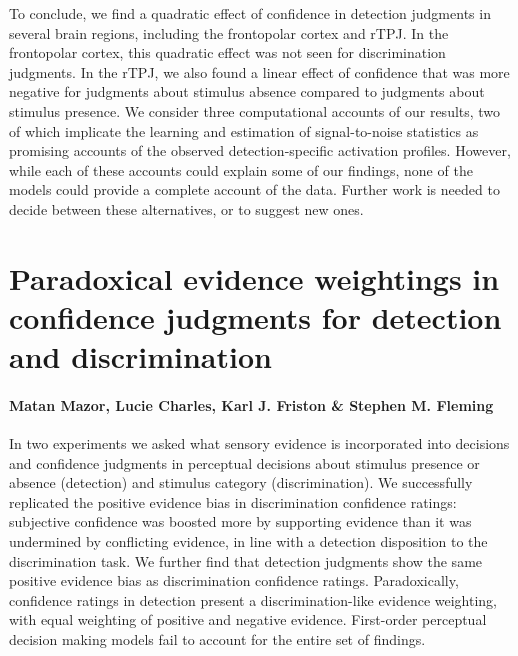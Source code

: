 \documentclass[12pt,twoside]{reedthesis}
\begin{document}
To conclude, we find a quadratic effect of confidence in detection judgments in several brain regions, including the frontopolar cortex and rTPJ. In the frontopolar cortex, this quadratic effect was not seen for discrimination judgments. In the rTPJ, we also found a linear effect of confidence that was more negative for judgments about stimulus absence compared to judgments about stimulus presence. We consider three computational accounts of our results, two of which implicate the learning and estimation of signal-to-noise statistics as promising accounts of the observed detection-specific activation profiles. However, while each of these accounts could explain some of our findings, none of the models could provide a complete account of the data. Further work is needed to decide between these alternatives, or to suggest new ones.

\hypertarget{ch:RC}{%
\chapter{Paradoxical evidence weightings in confidence judgments for detection and discrimination}\label{ch:RC}}

\hypertarget{matan-mazor-lucie-charles-karl-j.-friston-stephen-m.-fleming}{%
\subsubsection*{Matan Mazor, Lucie Charles, Karl J. Friston \& Stephen M. Fleming}\label{matan-mazor-lucie-charles-karl-j.-friston-stephen-m.-fleming}}

In two experiments we asked what sensory evidence is incorporated into decisions and confidence judgments in perceptual decisions about stimulus presence or absence (detection) and stimulus category (discrimination). We successfully replicated the positive evidence bias in discrimination confidence ratings: subjective confidence was boosted more by supporting evidence than it was undermined by conflicting evidence, in line with a detection disposition to the discrimination task. We further find that detection judgments show the same positive evidence bias as discrimination confidence ratings. Paradoxically, confidence ratings in detection present a discrimination-like evidence weighting, with equal weighting of positive and negative evidence. First-order perceptual decision making models fail to account for the entire set of findings.
\end{document}
